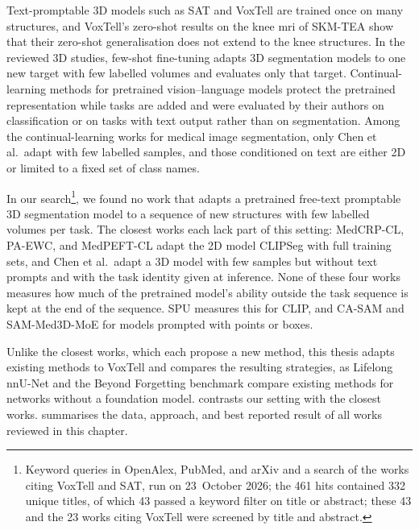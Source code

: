 Text-promptable 3D models such as SAT and VoxTell are trained once on many structures, and VoxTell's zero-shot results on the knee \gls{mri} of SKM-TEA show that their zero-shot generalisation does not extend to the knee structures.
In the reviewed 3D studies, few-shot fine-tuning adapts 3D segmentation models to one new target with few labelled volumes and evaluates only that target.
Continual-learning methods for pretrained vision--language models protect the pretrained representation while tasks are added and were evaluated by their authors on classification or on tasks with text output rather than on segmentation.
Among the continual-learning works for medical image segmentation, only Chen et al.\ adapt with few labelled samples, and those conditioned on text are either 2D or limited to a fixed set of class names.



In our search\footnote{Keyword queries in OpenAlex, PubMed, and arXiv and a search of the works citing VoxTell and SAT, run on 23~October 2026; the 461 hits contained 332 unique titles, of which 43 passed a keyword filter on title or abstract; these 43 and the 23 works citing VoxTell were screened by title and abstract.}, we found no work that adapts a pretrained free-text promptable 3D segmentation model to a sequence of new structures with few labelled volumes per task.
The closest works each lack part of this setting: MedCRP-CL, PA-EWC, and MedPEFT-CL adapt the 2D model CLIPSeg with full training sets, and Chen et al.\ adapt a 3D model with few samples but without text prompts and with the task identity given at inference.
None of these four works measures how much of the pretrained model's ability outside the task sequence is kept at the end of the sequence.
SPU measures this for CLIP, and CA-SAM and SAM-Med3D-MoE for models prompted with points or boxes.

Unlike the closest works, which each propose a new method, this thesis adapts existing methods to VoxTell and compares the resulting strategies, as Lifelong nnU-Net and the Beyond Forgetting benchmark compare existing methods for networks without a foundation model.
 contrasts our setting with the closest works.
 summarises the data, approach, and best reported result of all works reviewed in this chapter.

\clearpage

